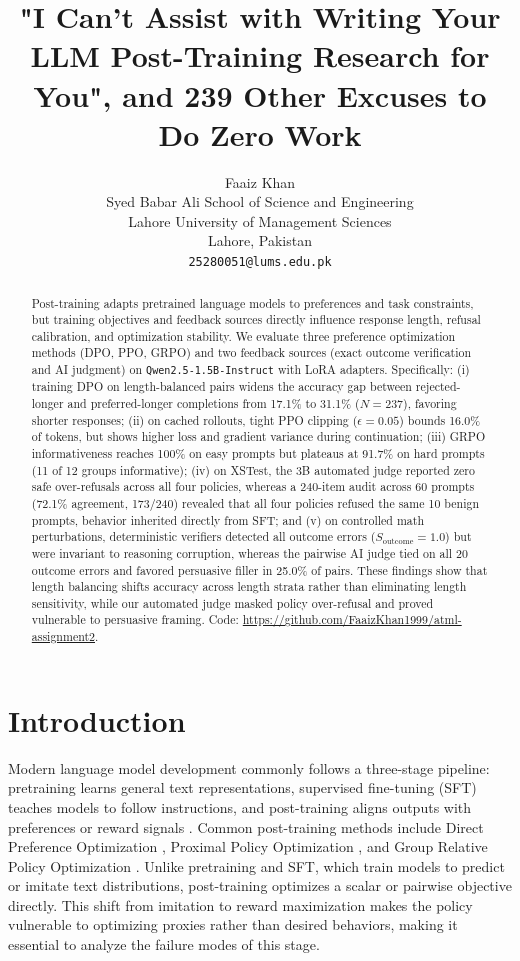 \documentclass{article}
\title{"I Can't Assist with Writing Your LLM Post-Training Research for You", and 239 Other Excuses to Do Zero Work}
\author{
  Faaiz Khan \\
  Syed Babar Ali School of Science and Engineering\\
  Lahore University of Management Sciences\\
  Lahore, Pakistan\\
  \texttt{25280051@lums.edu.pk} \\
}
\begin{document}
\maketitle

\begin{abstract}
  Post-training adapts pretrained language models to preferences and task constraints, but training objectives and feedback sources directly influence response length, refusal calibration, and optimization stability. We evaluate three preference optimization methods (DPO, PPO, GRPO) and two feedback sources (exact outcome verification and AI judgment) on \texttt{Qwen2.5-1.5B-Instruct} with LoRA adapters. Specifically: (i) training DPO on length-balanced pairs widens the accuracy gap between rejected-longer and preferred-longer completions from 17.1\% to 31.1\% ($N = 237$), favoring shorter responses; (ii) on cached rollouts, tight PPO clipping ($\epsilon = 0.05$) bounds 16.0\% of tokens, but shows higher loss and gradient variance during continuation; (iii) GRPO informativeness reaches 100\% on easy prompts but plateaus at 91.7\% on hard prompts (11 of 12 groups informative); (iv) on XSTest, the 3B automated judge reported zero safe over-refusals across all four policies, whereas a 240-item audit across 60 prompts (72.1\% agreement, 173/240) revealed that all four policies refused the same 10 benign prompts, behavior inherited directly from SFT; and (v) on controlled math perturbations, deterministic verifiers detected all outcome errors ($S_{\text{outcome}} = 1.0$) but were invariant to reasoning corruption, whereas the pairwise AI judge tied on all 20 outcome errors and favored persuasive filler in 25.0\% of pairs. These findings show that length balancing shifts accuracy across length strata rather than eliminating length sensitivity, while our automated judge masked policy over-refusal and proved vulnerable to persuasive framing. Code: \url{https://github.com/FaaizKhan1999/atml-assignment2}.
\end{abstract}

\section{Introduction}

Modern language model development commonly follows a three-stage pipeline: pretraining learns general text representations, supervised fine-tuning (SFT) teaches models to follow instructions, and post-training aligns outputs with preferences or reward signals \citep{ouyang2022instructgpt}. Common post-training methods include Direct Preference Optimization \citep[DPO;][]{rafailov2023dpo}, Proximal Policy Optimization \citep[PPO;][]{schulman2017ppo, ouyang2022instructgpt}, and Group Relative Policy Optimization \citep[GRPO;][]{shao2024deepseekmath}. Unlike pretraining and SFT, which train models to predict or imitate text distributions, post-training optimizes a scalar or pairwise objective directly. This shift from imitation to reward maximization makes the policy vulnerable to optimizing proxies rather than desired behaviors, making it essential to analyze the failure modes of this stage.
\end{document}
